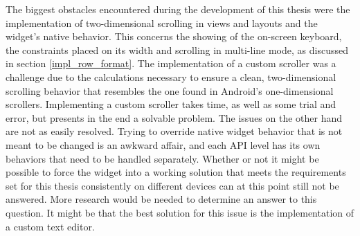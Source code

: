 The biggest obstacles encountered during the development of this thesis were the implementation of two-dimensional scrolling in views and layouts and the  widget's native behavior. This concerns the showing of the on-screen keyboard, the constraints placed on its width and scrolling in multi-line mode, as discussed in section \ref{impl_row_format}. The implementation of a custom scroller was a challenge due to the calculations necessary to ensure a clean, two-dimensional scrolling behavior that resembles the one found in Android's one-dimensional scrollers. Implementing a custom scroller takes time, as well as some trial and error, but presents in the end a solvable problem. The  issues on the other hand are not as easily resolved. Trying to override native widget behavior that is not meant to be changed is an awkward affair, and each \gls{API} level has its own behaviors that need to be handled separately. Whether or not it might be possible to force the  widget into a working solution that meets the requirements set for this thesis consistently on different devices can at this point still not be answered. More research would be needed to determine an answer to this question. It might be that the best solution for this issue is the implementation of a custom text editor. 